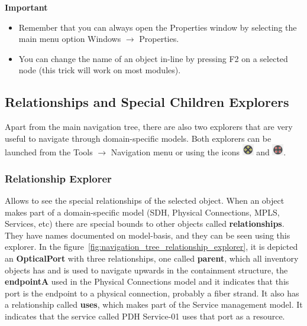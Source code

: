 \documentclass[a4paper]{article}
\begin{document}
	\begin{framed} {\large \textbf{Important}}
		\begin{itemize}
			\item Remember that you can always open the Properties window by selecting the main menu option Windows $\rightarrow$ Properties.
			\item You can change the name of an object in-line by pressing F2 on a selected node (this trick will work on most modules).
		\end{itemize}
	\end{framed}
	\subsection{Relationships and Special Children Explorers} \label{sec:extra_explorers}
	Apart from the main navigation tree, there are also two explorers that are very useful to navigate through domain-specific models. Both explorers can be launched from the Tools $\rightarrow$ Navigation menu or using the icons \includegraphics[width=0.5cm]{img/icon_relationship_explorer.png} and \includegraphics[width=0.5cm]{img/icon_special_children_explorer.png}.

	\subsubsection{Relationship Explorer} \label{sec:extra_explorers_relationship_explorer}
		Allows to see the special relationships of the selected object. When an object makes part of a domain-specific model (SDH, Physical Connections, MPLS, Services, etc) there are special bounds to other objects called \textbf{relationships}. They have names documented on model-basis, and they can be seen using this explorer. In the figure~\ref{fig:navigation_tree_relationship_explorer}, it is depicted an \textbf{OpticalPort} with three relationships, one called \textbf{parent}, which all inventory objects has and is used to navigate upwards in the containment structure, the \textbf{endpointA} used in the Physical Connections model and it indicates that this port is the endpoint to a physical connection, probably a fiber strand. It also has a relationship called \textbf{uses}, which makes part of the Service management model. It indicates that the service called PDH Service-01 uses that port as a resource.
		
\end{document}
